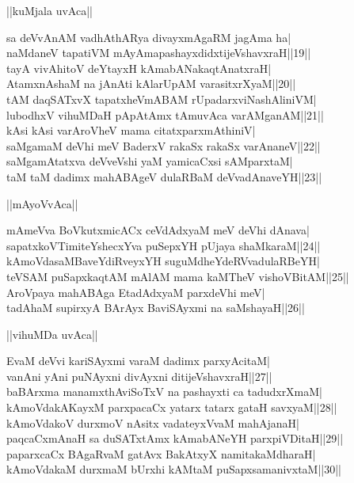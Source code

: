 \documentclass{article}
\begin{document}
\begin{center}
||kuMjala uvAca||
\end{center}

sa deVvAnAM vadhAthARya divayxmAgaRM jagAma ha|\\
naMdaneV tapatiVM mAyAmapashayxdidxtijeVshavxraH||19||\\
tayA vivAhitoV deYtayxH kAmabANakaqtAnatxraH|\\
AtamxnAshaM na jAnAti kAlarUpAM varasitxrXyaM||20||\\
tAM daqSATxvX tapatxheVmABAM rUpadarxviNashAliniVM|\\
lubodhxV vihuMDaH pApAtAmx tAmuvAca varAMganAM||21||\\
kAsi kAsi varAroVheV mama citatxparxmAthiniV|\\
saMgamaM deVhi meV BaderxV rakaSx rakaSx varAnaneV||22||\\
saMgamAtatxva deVveVshi yaM yamicaCxsi sAMparxtaM|\\
taM taM dadimx mahABAgeV dulaRBaM deVvadAnaveYH||23||\\

\begin{center}
||mAyoVvAca||
\end{center}

mAmeVva BoVkutxmicACx ceVdAdxyaM meV deVhi dAnava|\\
sapatxkoVTimiteYshecxYva puSepxYH pUjaya shaMkaraM||24||\\
kAmoVdasaMBaveYdiRveyxYH suguMdheYdeRVvadulaRBeYH|\\
teVSAM puSapxkaqtAM mAlAM  mama kaMTheV vishoVBitAM||25||\\
AroVpaya mahABAga EtadAdxyaM parxdeVhi meV|\\
tadAhaM supirxyA BArAyx BaviSAyxmi na saMshayaH||26||\\

\begin{center}
||vihuMDa uvAca||
\end{center}

EvaM deVvi kariSAyxmi varaM dadimx parxyAcitaM|\\
vanAni yAni puNAyxni divAyxni ditijeVshavxraH||27||\\
baBArxma manamxthAviSoTxV na pashayxti ca tadudxrXmaM|\\
kAmoVdakAKayxM parxpacaCx yatarx tatarx gataH savxyaM||28||\\
kAmoVdakoV durxmoV nAsitx vadateyxVvaM mahAjanaH|\\
paqcaCxmAnaH sa duSATxtAmx kAmabANeYH parxpiVDitaH||29||\\
paparxcaCx BAgaRvaM gatAvx BakAtxyX namitakaMdharaH|\\
kAmoVdakaM durxmaM bUrxhi kAMtaM puSapxsamanivxtaM||30||\\
\end{document}
